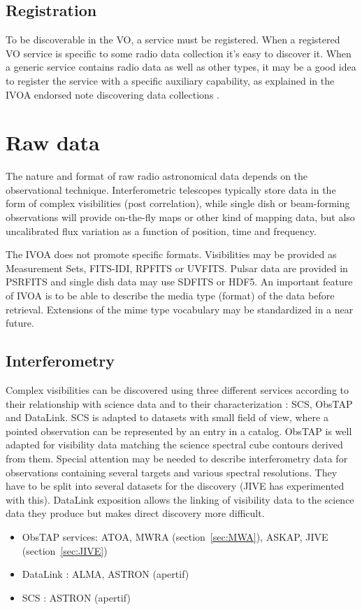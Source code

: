 \documentclass[11pt,a4paper]{ivoa}
\begin{document}
\subsection{Registration} 
To be discoverable in the VO, a service must be registered.
When a registered VO service is specific to some radio data collection it's easy to discover it. When a generic service contains radio data as well as other types, it may be a good idea to register the service with a specific auxiliary capability, as explained in the IVOA endorsed note discovering data collections \citep{2019ivoa.rept.0520D}.

\section{Raw data}
The nature and format of raw radio astronomical data 
depends on the observational technique. Interferometric telescopes typically store data in the form of complex visibilities (post correlation), while single dish or beam-forming observations will provide on-the-fly maps or other kind of mapping data, but also uncalibrated flux variation as a function of position, time and frequency. 

The IVOA does not promote specific formats. Visibilities may be provided as Measurement Sets, FITS-IDI, RPFITS or UVFITS. Pulsar data are provided in PSRFITS and single dish data may use SDFITS or HDF5. An important feature of IVOA is to be able to describe the media type (format) of the data before retrieval. Extensions of the mime type vocabulary may be standardized in a near future.  

\subsection{Interferometry}
Complex visibilities can be discovered using three different services according to their relationship with science data and to their characterization : SCS, ObsTAP and DataLink. SCS is adapted to datasets with small field of view, where a pointed observation can be
represented by an entry in a catalog. ObsTAP is well adapted for visibility data matching the science spectral cube contours derived from them. Special attention may be needed to describe interferometry data for observations containing several targets and various spectral resolutions. They have to be split into several datasets for the discovery (JIVE has experimented with this). DataLink exposition allows the linking of visibility data to the science data they produce but makes direct discovery more difficult. 
\begin{itemize}
\item ObsTAP services: ATOA, MWRA (section~\ref{sec:MWA}), ASKAP, JIVE (section~\ref{sec:JIVE})
\item DataLink : ALMA, ASTRON (apertif)
\item SCS : ASTRON (apertif)
\end{itemize}
\end{document}
